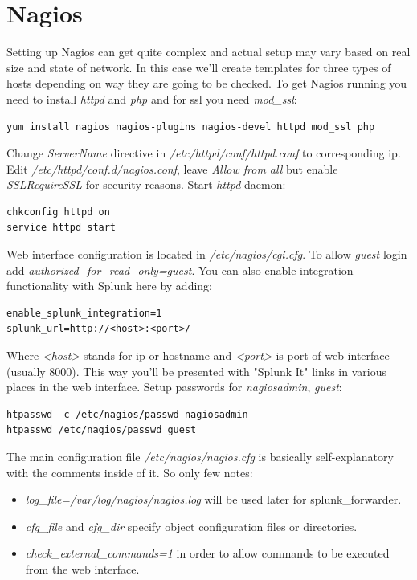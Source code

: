 \documentclass[10pt,a4paper,final]{report}
\begin{document}
\chapter{Nagios}

Setting up Nagios can get quite complex and actual setup may vary based on real size and state of network. In this case we'll create templates for three types of hosts depending on way they are going to be checked. To get Nagios running you need to install \emph{httpd} and \emph{php} and for ssl you need \emph{mod\_ssl}:
\begin{lstlisting}
yum install nagios nagios-plugins nagios-devel httpd mod_ssl php
\end{lstlisting}
Change \emph{ServerName} directive in \emph{/etc/httpd/conf/httpd.conf} to corresponding ip.
Edit \emph{/etc/httpd/conf.d/nagios.conf}, leave \emph{Allow from all} but enable \emph{SSLRequireSSL} for security reasons. Start \emph{httpd} daemon:
\begin{lstlisting}
chkconfig httpd on
service httpd start
\end{lstlisting}
Web interface configuration is located in \emph{/etc/nagios/cgi.cfg}. To allow \emph{guest} login add \emph{authorized\_for\_read\_only=guest}. You can also enable integration functionality with Splunk here by adding:
\begin{lstlisting}
enable_splunk_integration=1
splunk_url=http://<host>:<port>/
\end{lstlisting}
Where \emph{<host>} stands for ip or hostname and \emph{<port>} is port of web interface (usually 8000). This way you'll be presented with "Splunk It" links in various places in the web interface.
\newline Setup passwords for \emph{nagiosadmin}, \emph{guest}:
\begin{lstlisting}
htpasswd -c /etc/nagios/passwd nagiosadmin 
htpasswd /etc/nagios/passwd guest
\end{lstlisting}
The main configuration file \emph{/etc/nagios/nagios.cfg} is basically self-explanatory with the comments inside of it. So only few notes: 
\begin{itemize}
\item \emph{log\_file=/var/log/nagios/nagios.log} will be used later for splunk\_forwarder.
\item \emph{cfg\_file} and \emph{cfg\_dir} specify object configuration files or directories.
\item \emph{check\_external\_commands=1} in order to allow commands to be executed from the web interface.
\end{itemize}
\end{document}
